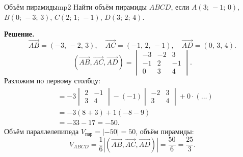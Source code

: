 \documentclass[12pt,a4paper]{article}
\begin{document}
\begin{exampleBox}{Объём пирамиды}{mp2}
  Найти объём пирамиды $ABCD$, если
  $A(3;\,-1;\,0)$, $B(0;\,-3;\,3)$, $C(2;\,1;\,-1)$, $D(3;\,2;\,4)$.

  \textbf{Решение.}
  \[
    \overrightarrow{AB} = (-3,\,-2,\,3), \quad
    \overrightarrow{AC} = (-1,\,2,\,-1), \quad
    \overrightarrow{AD} = (0,\,3,\,4).
  \]
  \[
    (\overrightarrow{AB},\overrightarrow{AC},\overrightarrow{AD}) =
    \begin{vmatrix}
      -3 & -2 & 3 \\
      -1 &  2 & -1 \\
      0 &  3 & 4
    \end{vmatrix}.
  \]
  Разложим по первому столбцу:
  \begin{align*}
    &= -3
    \begin{vmatrix}2&-1\\3&4
    \end{vmatrix}
    -(-1)
    \begin{vmatrix}-2&3\\3&4
    \end{vmatrix}
    + 0\cdot(\ldots) \\
    &= -3(8+3) + 1(-8-9) \\
    &= -33 - 17 = -50.
  \end{align*}
  Объём параллелепипеда $V_{\text{пар}} = |-50| = 50$,
  объём пирамиды:
  \[
    V_{ABCD} = \frac{1}{6}|(\overrightarrow{AB},
    \overrightarrow{AC},\overrightarrow{AD})|
    = \frac{50}{6} = \frac{25}{3}.
  \]
\end{exampleBox}
\end{document}
